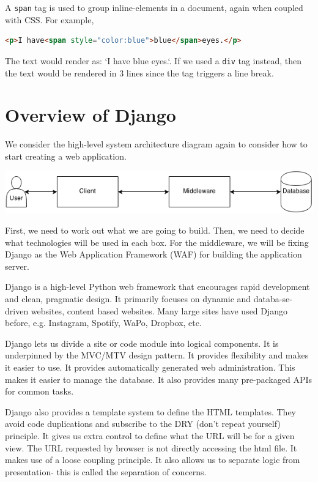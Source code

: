 \documentclass[a4paper, openany]{memoir}
\begin{document}
    \noindent A \texttt{span} tag is used to group inline-elements in a document, again when coupled with CSS. For example,
    \begin{lstlisting}[language=html]
    <p>I have<span style="color:blue">blue</span>eyes.</p>
    \end{lstlisting}
    The text would render as: `I have {\color{blue}blue} eyes.`. If we used a \texttt{div} tag instead, then the text would be rendered in 3 lines since the tag triggers a line break.
    \newpage

    \section{Overview of Django}
    We consider the high-level system architecture diagram again to consider how to start creating a web application.
    \begin{center}
        \includegraphics[scale=0.8]{src/L1I1.png}
    \end{center}
    First, we need to work out what we are going to build. Then, we need to decide what technologies will be used in each box. For the middleware, we will be fixing Django as the Web Application Framework (WAF) for building the application server.

    \noindent Django is a high-level Python web framework that encourages rapid development and clean, pragmatic design. It primarily focuses on dynamic and databa-se-driven websites, content based websites. Many large sites have used Django before, e.g. Instagram, Spotify, WaPo, Dropbox, etc.

    \noindent Django lets us divide a site or code module into logical components. It is underpinned by the MVC/MTV design pattern. It provides flexibility and makes it easier to use. It provides automatically generated web administration. This makes it easier to manage the database. It also provides many pre-packaged APIs for common tasks.

    \noindent Django also provides a template system to define the HTML templates. They avoid code duplications and subscribe to the DRY (don't repeat yourself) principle. It gives us extra control to define what the URL will be for a given view. The URL requested by browser is not directly accessing the html file. It makes use of a loose coupling principle. It also allows us to separate logic from presentation- this is called the separation of concerns.
\end{document}
